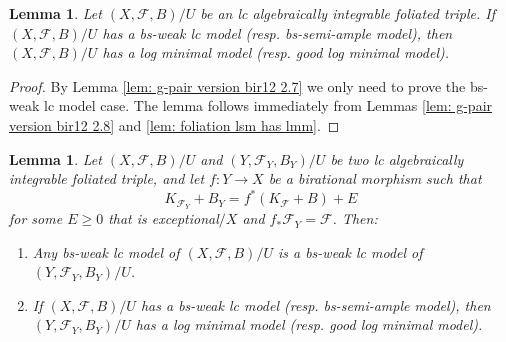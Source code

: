 \documentclass[11pt]{amsart}
\numberwithin{equation}{section}
\newcommand{\Ff}{\mathcal{F}}
\newtheorem{lem}[thm]{Lemma}
\theoremstyle{definition}
\theoremstyle{definition}
\theoremstyle{definition}
\begin{document}
\begin{lem}\label{lem: g-pair weak glc imply lmm}
Let $(X,\Ff,B)/U$ be an lc algebraically integrable foliated triple. If $(X,\Ff,B)/U$ has a bs-weak lc model (resp. bs-semi-ample model), then $(X,\Ff,B)/U$ has a log minimal model (resp. good log minimal model).
\end{lem}
\begin{proof}
By Lemma \ref{lem: g-pair version bir12 2.7} we only need to prove the bs-weak lc model case. The lemma follows immediately from Lemmas \ref{lem: g-pair version bir12 2.8} and \ref{lem: foliation lsm has lmm}.
\end{proof}




\begin{lem}\label{lem: same weak glc model under pullback}
Let $(X,\Ff,B)/U$ and $(Y,\Ff_Y,B_Y)/U$ be two lc algebraically integrable foliated triple, and let $f: Y\rightarrow X$ be a birational morphism such that
$$K_{\Ff_Y}+B_Y=f^*(K_\Ff+B)+E$$
for some $E\geq 0$ that is exceptional$/X$ and $f_*\Ff_Y=\Ff$. Then:
\begin{enumerate}
    \item Any bs-weak lc model of $(X,\Ff,B)/U$ is a bs-weak lc model of $(Y,\Ff_Y,B_Y)/U$.
    \item If $(X,\Ff,B)/U$ has a bs-weak lc model (resp. bs-semi-ample model), then $(Y,\Ff_Y,B_Y)/U$ has a log minimal model (resp. good log minimal model).
\end{enumerate}
\end{lem}
\end{document}
